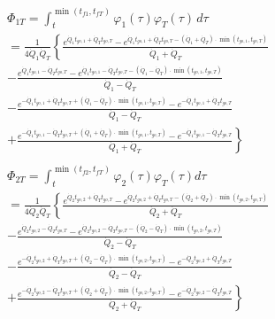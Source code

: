 \begin{equation}
\label{eq:54}
\begin{gathered}
  {\Phi _{1T}} = \int_t^{\min ({t_{f1}},{t_{fT}})} {{\varphi _1}} (\tau ){\varphi _T}(\tau )\,d\tau  \\ 
   = \frac{1}{{4{{\dot Q}_1}{{\dot Q}_T}}}\left\{ {\frac{{{e^{{{\dot Q}_1}{t_{go,1}} + {{\dot Q}_T}{t_{go,T}}}} - {e^{{{\dot Q}_1}{t_{go,1}} + {{\dot Q}_T}{t_{go,T}} - ({{\dot Q}_1} + {{\dot Q}_T}) \cdot \min ({t_{go,1}},{t_{go,T}})}}}}{{{{\dot Q}_1} + {{\dot Q}_T}}}} \right. \\ 
   - \frac{{{e^{{{\dot Q}_1}{t_{go,1}} - {{\dot Q}_T}{t_{go,T}}}} - {e^{{{\dot Q}_1}{t_{go,1}} - {{\dot Q}_T}{t_{go,T}} - ({{\dot Q}_1} - {{\dot Q}_T}) \cdot \min ({t_{go,1}},{t_{go,T}})}}}}{{{{\dot Q}_1} - {{\dot Q}_T}}} \\ 
   - \frac{{{e^{ - {{\dot Q}_1}{t_{go,1}} + {{\dot Q}_T}{t_{go,T}} + ({{\dot Q}_1} - {{\dot Q}_T}) \cdot \min ({t_{go,1}},{t_{go,T}})}} - {e^{ - {{\dot Q}_1}{t_{go,1}} + {{\dot Q}_T}{t_{go,T}}}}}}{{{{\dot Q}_1} - {{\dot Q}_T}}} \\ 
  \left. { + \frac{{{e^{ - {{\dot Q}_1}{t_{go,1}} - {{\dot Q}_T}{t_{go,T}} + ({{\dot Q}_1} + {{\dot Q}_T}) \cdot \min ({t_{go,1}},{t_{go,T}})}} - {e^{ - {{\dot Q}_1}{t_{go,1}} - {{\dot Q}_T}{t_{go,T}}}}}}{{{{\dot Q}_1} + {{\dot Q}_T}}}} \right\} \\ 
\end{gathered}
\end{equation}
\begin{equation}
\label{eq:55}
\begin{gathered}
  {\Phi _{2T}} = \int_t^{\min ({t_{f2}},{t_{fT}})} {{\varphi _2}} (\tau ){\varphi _T}(\tau )d\tau  \\ 
   = \frac{1}{{4{{\dot Q}_2}{{\dot Q}_T}}}\left\{ {\frac{{{e^{{{\dot Q}_2}{t_{go,2}} + {{\dot Q}_T}{t_{go,T}}}} - {e^{{{\dot Q}_2}{t_{go,2}} + {{\dot Q}_T}{t_{go,T}} - ({{\dot Q}_2} + {{\dot Q}_T}) \cdot \min ({t_{go,2}},{t_{go,T}})}}}}{{{{\dot Q}_2} + {{\dot Q}_T}}}} \right. \\ 
   - \frac{{{e^{{{\dot Q}_2}{t_{go,2}} - {{\dot Q}_T}{t_{go,T}}}} - {e^{{{\dot Q}_2}{t_{go,2}} - {{\dot Q}_T}{t_{go,T}} - ({{\dot Q}_2} - {{\dot Q}_T}) \cdot \min ({t_{go,2}},{t_{go,T}})}}}}{{{{\dot Q}_2} - {{\dot Q}_T}}} \\ 
   - \frac{{{e^{ - {{\dot Q}_2}{t_{go,2}} + {{\dot Q}_T}{t_{go,T}} + ({{\dot Q}_2} - {{\dot Q}_T}) \cdot \min ({t_{go,2}},{t_{go,T}})}} - {e^{ - {{\dot Q}_2}{t_{go,2}} + {{\dot Q}_T}{t_{go,T}}}}}}{{{{\dot Q}_2} - {{\dot Q}_T}}} \\ 
  \left. { + \frac{{{e^{ - {{\dot Q}_2}{t_{go,2}} - {{\dot Q}_T}{t_{go,T}} + ({{\dot Q}_2} + {{\dot Q}_T}) \cdot \min ({t_{go,2}},{t_{go,T}})}} - {e^{ - {{\dot Q}_2}{t_{go,2}} - {{\dot Q}_T}{t_{go,T}}}}}}{{{{\dot Q}_2} + {{\dot Q}_T}}}} \right\} \\ 
\end{gathered}
\end{equation}
